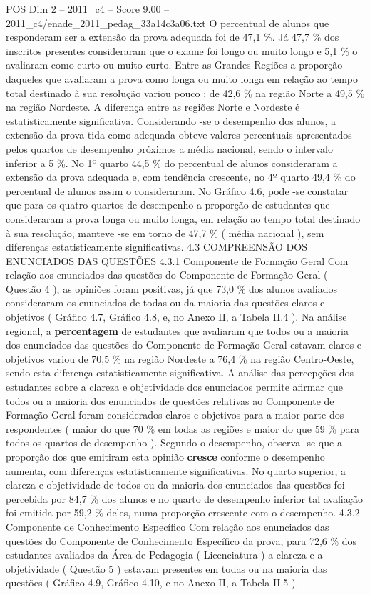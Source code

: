 \begin{textsample}{POS Dim 2 – 2011\_c4 – Score 9.00 – 2011\_c4/enade\_2011\_pedag\_33a14c3a06.txt}
O percentual de alunos que responderam ser a extensão da prova adequada foi de 47,1 \%.
Já 47,7 \% dos inscritos presentes consideraram que o exame foi longo ou muito longo e 5,1 \% o avaliaram como curto ou muito curto.
Entre as Grandes Regiões a proporção daqueles que avaliaram a prova como longa ou muito longa em relação ao tempo total destinado à sua resolução variou pouco : de 42,6 \% na região Norte a 49,5 \% na região Nordeste.
A diferença entre as regiões Norte e Nordeste é estatisticamente significativa.
Considerando -se o desempenho dos alunos, a extensão da prova tida como adequada obteve valores percentuais apresentados pelos quartos de desempenho próximos a média nacional, sendo o intervalo inferior a 5 \%.
No 1º quarto 44,5 \% do percentual de alunos consideraram a extensão da prova adequada e, com tendência crescente, no 4º quarto 49,4 \% do percentual de alunos assim o consideraram.
No Gráfico 4.6, pode -se constatar que para os quatro quartos de desempenho a proporção de estudantes que consideraram a prova longa ou muito longa, em relação ao tempo total destinado à sua resolução, manteve -se em torno de 47,7 \% ( média nacional ), sem diferenças estatisticamente significativas. 4.3 COMPREENSÃO DOS ENUNCIADOS DAS QUESTÕES 4.3.1 Componente de Formação Geral Com relação aos enunciados das questões do Componente de Formação Geral ( Questão 4 ), as opiniões foram positivas, já que 73,0 \% dos alunos avaliados consideraram os enunciados de todas ou da maioria das questões claros e objetivos ( Gráfico 4.7, Gráfico 4.8, e, no Anexo II, a Tabela II.4 ).
Na análise regional, a \textbf{percentagem} de estudantes que avaliaram que todos ou a maioria dos enunciados das questões do Componente de Formação Geral estavam claros e objetivos variou de 70,5 \% na região Nordeste a 76,4 \% na região Centro-Oeste, sendo esta diferença estatisticamente significativa.
A análise das percepções dos estudantes sobre a clareza e objetividade dos enunciados permite afirmar que todos ou a maioria dos enunciados de questões relativas ao Componente de Formação Geral foram considerados claros e objetivos para a maior parte dos respondentes ( maior do que 70 \% em todas as regiões e maior do que 59 \% para todos os quartos de desempenho ).
Segundo o desempenho, observa -se que a proporção dos que emitiram esta opinião \textbf{cresce} conforme o desempenho aumenta, com diferenças estatisticamente significativas.
No quarto superior, a clareza e objetividade de todos ou da maioria dos enunciados das questões foi percebida por 84,7 \% dos alunos e no quarto de desempenho inferior tal avaliação foi emitida por 59,2 \% deles, numa proporção crescente com o desempenho. 4.3.2 Componente de Conhecimento Específico Com relação aos enunciados das questões do Componente de Conhecimento Específico da prova, para 72,6 \% dos estudantes avaliados da Área de Pedagogia ( Licenciatura ) a clareza e a objetividade ( Questão 5 ) estavam presentes em todas ou na maioria das questões ( Gráfico 4.9, Gráfico 4.10, e no Anexo II, a Tabela II.5 ).

\end{textsample}
